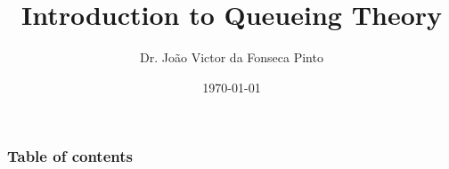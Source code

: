 \documentclass{beamer}
\begin{document}
\title{Introduction to Queueing Theory}  
\author{Dr. João Victor da Fonseca Pinto}
\date{\today} 

\begin{frame}
\titlepage
\end{frame}

\begin{frame}
    \frametitle{Table of contents}
    \tableofcontents
\end{frame} 


\end{document}
